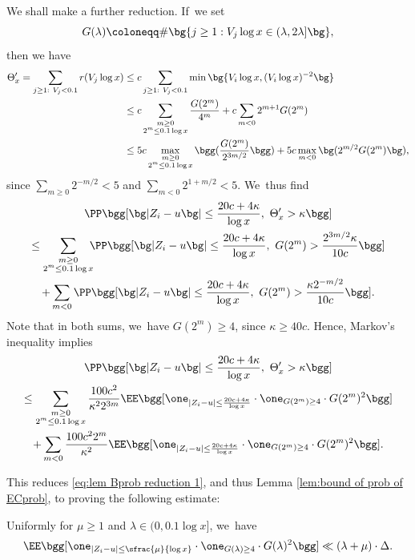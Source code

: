 We shall make a further reduction. If~we set
\[
G(\lambda)\coloneqq \#\bg\{j\ge1: V_j\log x\in (\lambda,2\lambda] \bg\},
\]
then we have
\[
\begin{split}
\Theta_x' =\sum_{j\ge1:\ V_j<0.1} r(V_j\log x)
&\le c\sum_{j\ge1:\ V_j<0.1}\min\bg\{V_i\log x,(V_i\log x)^{-2}\bg\} \\
&\le c\sum_{\substack{m\ge0 \\ 2^m\le 0.1\log x}} \frac{G(2^m)}{4^m} + c \sum_{m<0} 2^{m+1} G(2^m) \\
&\le 5c \max_{\substack{m\ge0 \\ 2^m\le 0.1\log x}} \bgg(\frac{G(2^m)}{2^{3m/2}} \bgg) + 5c \max_{m<0}\bg(2^{m/2} G(2^m)\bg),
\end{split}
\]
since $\sum_{m\ge0}2^{-m/2} <5$ and $\sum_{m<0}2^{1+m/2}< 5$. We~thus find
\begin{multline*}
\PP\bgg[ \bg| Z_i - u \bg|\le \frac{20c+4\kappa}{\log x},\ \Theta_x'>\kappa \bgg] \\
\le \sum_{\substack{m\ge0 \\ 2^m\le 0.1\log x}} \!\!\! \PP\bgg[ \bg| Z_i - u \bg|\le \frac{20c+4\kappa}{\log x},\ G(2^m)> \frac{2^{3m/2} \kappa}{10c} \bgg] \\
+\sum_{m<0} \PP\bgg[ \bg| Z_i - u \bg|\le \frac{20c+4\kappa}{\log x},\ G(2^m)> \frac{\kappa 2^{-m/2}}{10c} \bgg].
\end{multline*}
Note that in both sums, we~have $G(2^m)\ge 4$, since $\kappa\ge 40c$. Hence, Markov's inequality implies
\begin{multline*}
\PP\bgg[ \bg| Z_i - u \bg|\le \frac{20c+4\kappa}{\log x},\ \Theta_x'>\kappa \bgg] \\
\le \sum_{\substack{m\ge0 \\ 2^m\le 0.1\log x}} \frac{100c^2}{\kappa^22^{3m}}
\EE\bgg[ \one_{| Z_i - u |\le \frac{20c+4\kappa}{\log x} } \cdot \one_{G(2^m) \ge4} \cdot G(2^m)^2\bgg] \\
+\sum_{m<0} \frac{100c^22^m}{\kappa^2}
\EE\bgg[ \one_{| Z_i - u |\le \frac{20c+4\kappa}{\log x} }\cdot \one_{G(2^m) \ge4}\cdot G(2^m)^2\bgg].
\end{multline*}

This reduces \eqref{eq:lem Bprob reduction 1}, and thus Lemma \ref{lem:bound of prob of ECprob}, to proving the following estimate:

\begin{lem}
\label{lem:Bprob reduction 2} Uniformly for $\mu\ge1$ and $\lambda\in(0,0.1\log x]$, we~have
\[
\EE\bgg[ \one_{| Z_i - u |\le \sfrac{\mu}{\log x} } \cdot \one_{G(\lambda) \ge4} \cdot G(\lambda)^2 \bgg]
\ll (\lambda+\mu)\cdot \Delta.
\]
\end{lem}

